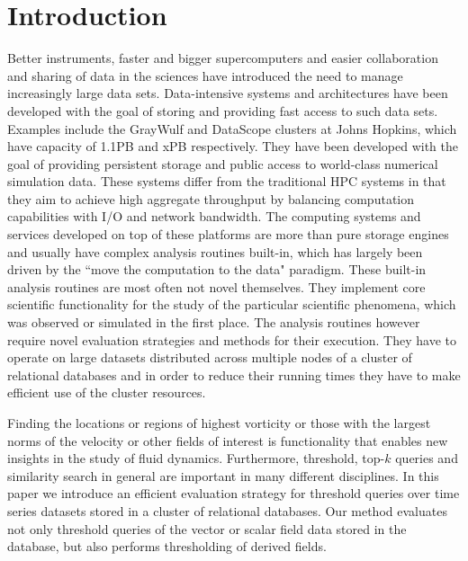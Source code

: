 \documentclass{sig-alternate}
\begin{document}
\section{Introduction}
Better instruments, faster and bigger supercomputers and easier collaboration and sharing of data in the sciences have introduced the need
to manage increasingly large data sets. Data-intensive systems and architectures have been developed with the goal of storing and providing
fast access to such data sets. Examples include the GrayWulf and DataScope clusters \cite{Szalay, TODO} at Johns Hopkins, which have capacity 
of 1.1PB and xPB
respectively. They have been developed with the goal of providing persistent storage and public access to world-class numerical simulation data. 
These systems differ from the traditional HPC systems in that they aim to achieve high aggregate throughput by balancing computation
capabilities with I/O and network bandwidth. The computing systems and services developed on top of these platforms are more than pure
storage engines and usually have complex analysis routines built-in, which has largely been driven by the ``move the computation to the data"
paradigm. These built-in analysis routines are most often not novel themselves. They implement core scientific functionality for the study of the
particular scientific phenomena, which was observed or simulated in the first place. The analysis routines however require novel evaluation strategies 
and methods for their execution. They have to operate on large datasets distributed across multiple nodes of a cluster of relational databases 
and in order to reduce their running times they have to make efficient use of the cluster resources. 

Finding the locations or regions of highest vorticity or those with the largest norms of the velocity or other fields of interest is
functionality that enables new insights in the study of fluid dynamics. Furthermore, threshold, top-$k$ queries and similarity search in general
are important in many different disciplines. In this paper we introduce an efficient evaluation strategy for threshold
queries over time series datasets stored in a cluster of relational databases. Our method evaluates not only threshold queries of the vector or 
scalar field data stored in the database, but also performs thresholding of derived fields.
\end{document}
